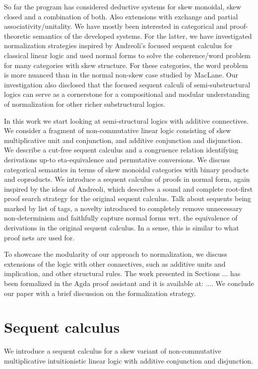 \documentclass[submission,copyright,creativecommons]{eptcs}
\theoremstyle{definition}
\begin{document}
So far the program has considered deductive systems for skew monoidal, skew closed and a combination of both. Also extensions with exchange and partial associativity/unitality. We have mostly been interested in categorical  and proof-theoretic semantics of the developed systems. For the latter, we have investigated normalization strategies inspired by Andreoli's focused sequent calculus for classical linear logic and used normal forms to solve the coherence/word problem for many categories with skew structure. For these categories, the word problem is more nuanced than in the normal non-skew case studied by MacLane. Our investigation also disclosed that the focused sequent calculi of semi-substructural logics can serve as a cornerstone for a compositional and modular understanding of normalization for other richer substructural logics.

In this work we start looking at semi-structural logics with additive connectives. We consider a fragment of non-commutative linear logic consisting of skew multiplicative unit and conjunction, and additive conjunction and disjunction. We describe a cut-free sequent calculus and a congruence relation identifying derivations up-to eta-equivalence and permutative conversions. We discuss categorical semantics in terms of skew monoidal categories with binary products and coproducts. We introduce a sequent calculus of proofs in normal form, again inspired by the ideas of Andreoli, which describes a sound and complete root-first proof search strategy for the original sequent calculus. Talk about sequents being marked by list of tags, a novelty introduced to completely remove unnecessary non-determinism and faithfully capture normal forms wrt. the equivalence of derivations in the original sequent calculus. In a sense, this is similar to what proof nets are used for.

To showcase the modularity of our approach to normalization, we discuss extensions of the logic with other connectives, such as additive units and implication, and other structural rules. The work presented in Sections ... has been formalized in the Agda proof assistant and it is available at: .... We conclude our paper with a brief discussion on the formalization strategy.

\section{Sequent calculus}
We introduce a sequent calculus for a skew variant of non-commutative multiplicative intuitionistic linear logic with additive conjunction and disjunction.
\end{document}
